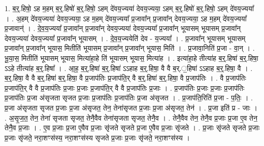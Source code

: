 \documentclass[17pt]{extarticle}
\begin{document}
1. ब॒र्॒.हिषो॒ ऽह म॒हम् ब॒र्॒.हिषो॑ ब॒र्॒.हिषो॒ ऽहम् दे॑वय॒ज्यया॑ देवय॒ज्यया॒ ऽहम् ब॒र्॒.हिषो॑ ब॒र्॒.हिषो॒ ऽहम् दे॑वय॒ज्यया᳚ । . अ॒हम् दे॑वय॒ज्यया॑ देवय॒ज्यया॒ ऽह म॒हम् दे॑वय॒ज्यया᳚ प्र॒जावा᳚न् प्र॒जावा᳚न् देवय॒ज्यया॒ ऽह म॒हम् दे॑वय॒ज्यया᳚ प्र॒जावान्॑ । . दे॒व॒य॒ज्यया᳚ प्र॒जावा᳚न् प्र॒जावा᳚न् देवय॒ज्यया॑ देवय॒ज्यया᳚ प्र॒जावा᳚न् भूयासम् भूयासम् प्र॒जावा᳚न् देवय॒ज्यया॑ देवय॒ज्यया᳚ प्र॒जावा᳚न् भूयासम् । . दे॒व॒य॒ज्ययेति॑ देव - य॒ज्यया᳚ । . प्र॒जावा᳚न् भूयासम् भूयासम् प्र॒जावा᳚न् प्र॒जावा᳚न् भूयास॒ मितीति॑ भूयासम् प्र॒जावा᳚न् प्र॒जावा᳚न् भूयास॒ मिति॑ । . प्र॒जावा॒निति॑ प्र॒जा - वा॒न् । . भू॒या॒स॒ मितीति॑ भूयासम् भूयास॒ मित्या॑हा॒हे ति॑ भूयासम् भूयास॒ मित्या॑ह । . इत्या॑हा॒हे तीत्या॑ह ब॒र्॒.हिषा॑ ब॒र्॒.हिषा॒ ऽऽहे तीत्या॑ह ब॒र्॒.हिषा᳚ । . आ॒ह॒ ब॒र्॒,हिषा॑ ब॒र्॒.हिषा॑ ऽऽहाह ब॒र्॒.हिषा॒ वै वै ब॒र्.॒हिषा॑ ऽऽहाह ब॒र्॒.हिषा॒ वै । . ब॒र्॒.हिषा॒ वै वै ब॒र्॒.हिषा॑ ब॒र्॒.हिषा॒ वै प्र॒जाप॑तिः प्र॒जाप॑ति॒र् वै ब॒र्॒.हिषा॑ ब॒र्॒.हिषा॒ वै प्र॒जाप॑तिः । . वै प्र॒जाप॑तिः प्र॒जाप॑ति॒र् वै वै प्र॒जाप॑तिः प्र॒जाः प्र॒जाः प्र॒जाप॑ति॒र् वै वै प्र॒जाप॑तिः प्र॒जाः । . प्र॒जाप॑तिः प्र॒जाः प्र॒जाः प्र॒जाप॑तिः प्र॒जाप॑तिः प्र॒जा अ॑सृजता सृजत प्र॒जाः प्र॒जाप॑तिः प्र॒जाप॑तिः प्र॒जा अ॑सृजत । . प्र॒जाप॑ति॒रिति॑ प्र॒जा - प॒तिः॒ । . प्र॒जा अ॑सृजता सृजत प्र॒जाः प्र॒जा अ॑सृजत॒ तेन॒ तेना॑सृजत प्र॒जाः प्र॒जा अ॑सृजत॒ तेन॑ । . प्र॒जा इति॑ प्र - जाः । . अ॒सृ॒ज॒त॒ तेन॒ तेना॑ सृजता सृजत॒ तेनै॒वैव तेना॑सृजता सृजत॒ तेनै॒व । . तेनै॒वैव तेन॒ तेनै॒व प्र॒जाः प्र॒जा ए॒व तेन॒ तेनै॒व प्र॒जाः । . ए॒व प्र॒जाः प्र॒जा ए॒वैव प्र॒जाः सृ॑जते सृजते प्र॒जा ए॒वैव प्र॒जाः सृ॑जते । . प्र॒जाः सृ॑जते सृजते प्र॒जाः प्र॒जाः सृ॑जते॒ नरा॒शꣳस॑स्य॒ नरा॒शꣳस॑स्य सृजते प्र॒जाः प्र॒जाः सृ॑जते॒ नरा॒शꣳस॑स्य । \newline
\end{document}
